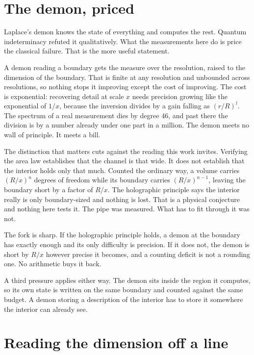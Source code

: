 \section{The demon, priced}

Laplace's demon knows the state of everything and computes the rest. Quantum indeterminacy refuted
it qualitatively. What the measurements here do is price the classical failure. That is the more
useful statement.

A demon reading a boundary gets the measure over the resolution, raised to the dimension of the
boundary. That is finite at any resolution and unbounded across resolutions, so nothing stops it
improving except the cost of improving. The cost is exponential: recovering detail at scale $x$
needs precision growing like the exponential of $1/x$, because the inversion divides by a gain
falling as $(r/R)^l$. The spectrum of a real measurement dies by degree 46, and past there the
division is by a number already under one part in a million. The demon meets no wall of principle.
It meets a bill.

The distinction that matters cuts against the reading this work invites. Verifying the area law
establishes that the channel is that wide. It does not establish that the interior holds only that
much. Counted the ordinary way, a volume carries $(R/x)^n$ degrees of freedom while its boundary
carries $(R/x)^{n-1}$, leaving the boundary short by a factor of $R/x$. The holographic principle says
the interior really is only boundary-sized and nothing is lost. That is a physical conjecture and
nothing here tests it. The pipe was measured. What has to fit through it was not.

The fork is sharp. If the holographic principle holds, a demon at the boundary has exactly enough
and its only difficulty is precision. If it does not, the demon is short by $R/x$ however precise it
becomes, and a counting deficit is not a rounding one. No arithmetic buys it back.

A third pressure applies either way. The demon sits inside the region it computes, so its own state
is written on the same boundary and counted against the same budget. A demon storing a description
of the interior has to store it somewhere the interior can already see.

\section{Reading the dimension off a line}

